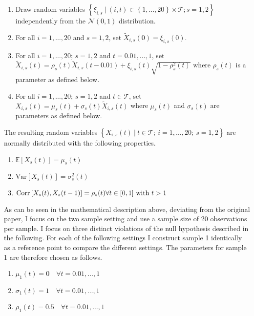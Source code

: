 \documentclass[12pt, a4paper]{article}
\theoremstyle{MAstyle} \newtheorem{assumption}{Assumption}[section]
\theoremstyle{MAstyle} \newtheorem{definition}{Definition}[section]
\theoremstyle{MAstyle} \newtheorem{theorem}{Theorem}[section]
\begin{document}
		\begin{enumerate}
			\item Draw random variables $\left\{\xi_{i,s} \ \vert \ (i,t) \in \left\{1, \dots, 20\right\} \times \mathcal{T} ; s = 1,2 \right\}$ independently from the $\mathcal{N}(0,1)$ distribution.
			\item For all $i = 1, \dots, 20$ and $s = 1,2$, set $\tilde{X}_{i,s}(0) = \xi_{i,s}(0)$.
			\item For all $i = 1, \dots, 20$; $s = 1,2$ and $t = 0.01, \dots, 1$, set $\tilde{X}_{i,s}(t) = \rho_{s}(t)\tilde{X}_{i,s}(t-0.01) + \xi_{i,s}(t)\sqrt{1-\rho_s^2(t)}$ where $\rho_{s}(t)$ is a parameter as defined below.
			\item For all $i = 1, \dots, 20$; $s = 1,2$ and $t \in \mathcal{T}$, set $X_{i,s}(t) = \mu_s(t) + \sigma_s(t)\tilde{X}_{i,s}(t)$ where $\mu_s(t)$ and $\sigma_s(t)$ are parameters as defined below.
		\end{enumerate}
		The resulting random variables $\left\{X_{i,s}(t) \ \vert \ t \in \mathcal{T}; \ i = 1, \dots, 20; \ s = 1,2\right\}$ are normally distributed with the following properties.
		\begin{multicols}{2}
			\begin{enumerate}
				\item $\mathbb{E}\left[X_s(t)\right] = \mu_s(t)$
				\item $\text{Var}\left[X_s(t)\right] = \sigma^2_s(t)$
				\item $\text{Corr}\left[X_s(t), X_s(t-1)\right] = \rho_s(t) \\ \forall t \in [0,1] \ \text{with} \ t > 1$
			\end{enumerate}
		\end{multicols}
		As can be seen in the mathematical description above, deviating from the original paper, I focus on the two sample setting and use a sample size of 20 observations per sample. I focus on three distinct violations of the null hypothesis described in the following. For each of the following settings I construct sample 1 identically as a reference point to compare the different settings. The parameters for sample 1 are therefore chosen as follows.
		\begin{multicols}{2}
			\begin{enumerate}
				\item $\mu_1(t) = 0 \quad \forall t = 0.01, \dots, 1$
				\item $\sigma_1(t) = 1 \quad \forall t = 0.01, \dots, 1$
				\item $ \rho_1(t) = 0.5 \quad \forall t = 0.01, \dots, 1$
			\end{enumerate}
		\end{multicols}
\end{document}
